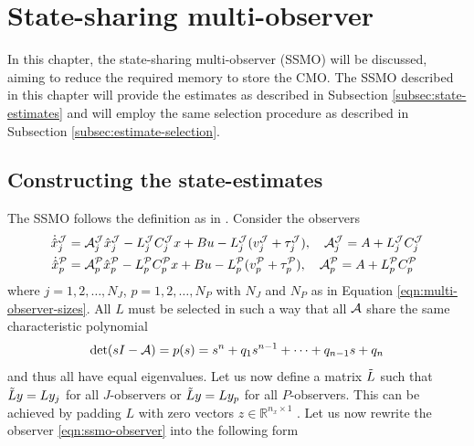 \section{State-sharing multi-observer}\label{ch:ssmo}
In this chapter, the state-sharing multi-observer (SSMO) will be discussed, aiming to reduce the required memory to store the CMO. The SSMO described in this chapter will provide the estimates as described in Subsection \ref{subsec:state-estimates} and will employ the same selection procedure as described in Subsection \ref{subsec:estimate-selection}.

\subsection{Constructing the state-estimates}
The SSMO follows the definition as in \cite{Chong2023MemoryAlgorithms}. Consider the observers
\begin{equation}\label{eqn:ssmo-observer}
    \begin{split}
        \dot{\hat{x}}^{\mathcal{J}}_{j} &= \mathcal{A}_j^{\mathcal{J}}\hat{x}^{\mathcal{J}}_{j} - L_{j}^{\mathcal{J}}C_{j}^{\mathcal{J}}x + Bu -L_{j}^{\mathcal{J}}(v_{j}^{\mathcal{J}} + \tau_{j}^{\mathcal{J}}), \quad \mathcal{A}_{j}^{\mathcal{J}}=A+L_{j}^{\mathcal{J}}C_{j}^{\mathcal{J}} \\
        \dot{\hat{x}}_{p}^{\mathcal{P}} &= \mathcal{A}_p^{\mathcal{P}}\hat{x}_{p}^{\mathcal{P}} - L_{p}^{\mathcal{P}}C_{p}^{\mathcal{P}}x + Bu -L_{p}^{\mathcal{P}}(v_{p}^{\mathcal{P}} + \tau_{p}^{\mathcal{P}}), \quad \mathcal{A}_{p}^{\mathcal{P}}=A+L_{p}^{\mathcal{P}}C_{p}^{\mathcal{P}} \\
    \end{split}
\end{equation}
where $j=1,2,\dots,N_J$, $p=1,2,\dots,N_P$ with $N_J$ and $N_P$ as in Equation \eqref{eqn:multi-observer-sizes}. All $L$ must be selected in such a way that all $\mathcal{A}$ share the same characteristic polynomial
\begin{equation}\label{eqn:ssmo-char-poly}
    \det(sI-\mathcal{A}) = p(s) = s^n + q_1s^{n-1} + \dots + q_{n-1}s + q_n
\end{equation}
and thus all have equal eigenvalues. Let us now define a matrix $\Tilde{L}$ such that $\Tilde{L}y=Ly_{j}$ for all $J$-observers or $\Tilde{L}y=Ly_{p}$ for all $P$-observers. This can be achieved by padding $L$ with zero vectors $z \in \mathbb{R}^{n_x \times 1}$ \cite{Chong2023MemoryAlgorithms}. Let us now rewrite the observer \eqref{eqn:ssmo-observer} into the following form

